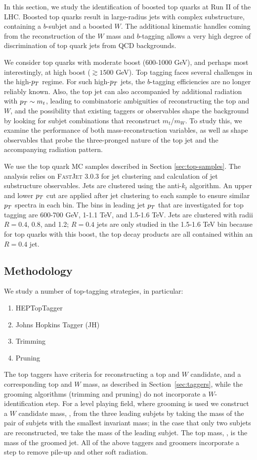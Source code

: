 In this section, we study the identification of boosted top quarks at Run II of the LHC. Boosted top quarks result in large-radius jets with complex substructure, containing a $b$-subjet and a boosted $W$. The additional kinematic handles coming from the reconstruction of the $W$ mass and $b$-tagging allows a very high degree of discrimination of top quark jets from QCD backgrounds. 

We consider top quarks with moderate boost (600-1000 GeV), and perhaps most interestingly, at high boost ($\gtrsim1500$ GeV). Top tagging faces several challenges in the high-$p_T$ regime. For such high-$p_T$ jets, the $b$-tagging efficiencies are no longer reliably known. Also, the top jet can also accompanied by additional radiation with $p_T\sim m_t$, leading to combinatoric ambiguities of reconstructing the top and $W$, and the possibility that existing taggers or observables shape the background by looking for subjet combinations that reconstruct $m_t$/$m_W$. To study this, we examine the performance of both mass-reconstruction variables, as well as shape observables that probe the three-pronged nature of the top jet and the accompanying radiation pattern.

We use the top quark MC samples described in Section \ref{sec:top-samples}. The analysis  relies on \textsc{FastJet} 3.0.3 for jet clustering and
calculation of jet substructure observables. Jets are clustered using the anti-$k_t$ algorithm. An upper and lower $p_T$ cut are applied after jet clustering
to each sample to ensure similar $p_T$ spectra in each bin. The bins in leading jet $p_T$
that are investigated for top tagging are 600-700 GeV, 1-1.1 TeV, and
1.5-1.6 TeV. Jets are clustered with radii $R=0.4$, 0.8, and 1.2; $R=0.4$ jets are only studied in the 1.5-1.6 TeV bin
because for top quarks with this boost, the top decay products are all contained within an $R=0.4$ jet.

\subsection{Methodology}\label{sec:topmethod}
We study a number of top-tagging strategies, in particular:
%
\begin{enumerate}
\item HEPTopTagger
\item Johns Hopkins Tagger (JH)
\item Trimming
\item Pruning
\end{enumerate}
%
The top taggers have criteria for reconstructing a top and $W$ candidate, and a corresponding top and $W$ mass, as described in Section~\ref{sec:taggers}, while the grooming algorithms (trimming and pruning) do not incorporate a $W$-identification step. For a level playing field, where grooming is used we construct a $W$ candidate mass, \wmass, from the three leading subjets by taking the mass of the pair of subjets with the smallest invariant mass; in the case that only two subjets are reconstructed, we take the mass of the leading subjet. The top mass, \topmass, is the mass of the groomed jet. All of the above taggers and groomers incorporate a step to remove pile-up and other soft radiation.

